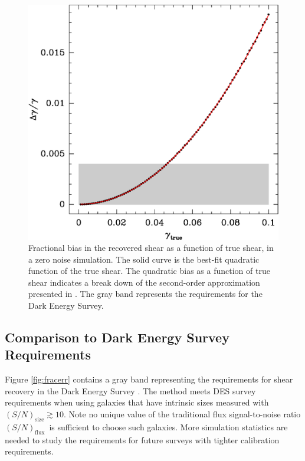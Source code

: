 \documentclass[12pt,preprint]{aastex}
\newcommand{\Tsn}{$(S/N)_{\textrm{size}}$}
\newcommand{\fsn}{$(S/N)_{\textrm{flux}}$}
\begin{document}
\begin{figure}[t] \centering
 \centering 
 \includegraphics[scale=0.6]{figures/fracerr-vs-shear.eps}

 \caption{Fractional bias in the recovered shear as a function of true shear,
     in a zero noise simulation.  The solid curve is the best-fit quadratic
     function of the true shear.  The quadratic bias as a function of true
     shear indicates a break down of the second-order approximation presented
     in \cite{ba14}. The gray band represents the requirements for the Dark
 Energy Survey. \label{fig:nonoise}}

\end{figure}

\subsection{Comparison to Dark Energy Survey Requirements} \label{sec:desreq}

Figure \ref{fig:fracerr} contains a gray band representing the requirements for
shear recovery in the Dark Energy Survey \citep[][DES]{DESWhitePaper}.  The
method meets DES survey requirements when using galaxies that have intrinsic
sizes measured with \Tsn$ \gtrsim 10$.  Note no unique value of the traditional
flux signal-to-noise ratio \fsn\ is sufficient to choose such galaxies.  More
simulation statistics are needed to study the requirements for future surveys
with tighter calibration requirements.
\end{document}
